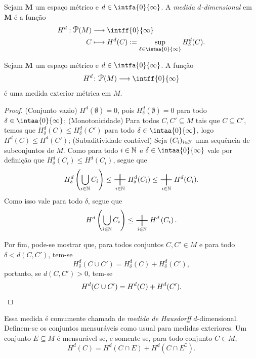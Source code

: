 \begin{defi}
Sejam $\bm M$ um espaço métrico e $d \in \intfa{0}{\infty}$. A \emph{medida $d$-dimensional} em $\bm M$ é a função
 	\begin{align*}
 	\func{H^d}{\p(M)}{\intff{0}{\infty}}{C}{H^d(C) := \sup_{\delta \in \intaa{0}{\infty}} H^d_\delta(C).}
 	\end{align*}
\end{defi}

\begin{prop}
Sejam $\bm M$ um espaço métrico e $d \in \intfa{0}{\infty}$. A função
	\begin{equation*}
	H^d\colon \p(M) \to \intff{0}{\infty}
	\end{equation*}
é uma medida exterior métrica em $M$.
\end{prop}
\begin{proof}
(Conjunto vazio) $H^d(\emptyset)=0$, pois $H^d_\delta(\emptyset)=0$ para todo $\delta \in \intaa{0}{\infty}$; (Monotonicidade) Para todos $C,C' \subseteq M$ tais que $C \subseteq C'$, temos que $H^d_\delta(C) \leq H^d_\delta(C')$ para todo $\delta \in \intaa{0}{\infty}$, logo $H^d(C) \leq H^d(C')$; (Subaditividade contável) Seja $(C_i)_{i \in \mathbb{N}}$ uma sequência de subconjuntos de $M$. Como para todo $i \in \mathbb{N}$ e $\delta \in \intaa{0}{\infty}$ vale por definição que $H^d_\delta(C_i) \leq H^d(C_i)$, segue que
	\begin{equation*}
	H^d_\delta\left( \bigcup_{i \in \N} C_i \right) \leq \sum_{i \in \N} H^d_\delta(C_i) \leq  \sum_{i \in \N} H^d(C_i).
	\end{equation*}
Como isso vale para todo $\delta$, segue que
	\begin{equation*}
	H^d\left( \bigcup_{i \in \N} C_i \right) \leq \sum_{i \in \N} H^d\left( C_i \right).
	\end{equation*}

Por fim, pode-se mostrar que, para todos conjuntos $C,C' \in M$ e para todo $\delta < d(C,C')$, tem-se
	\begin{equation*}
	H^d_\delta(C \cup C') = H^d_\delta(C) + H^d_\delta(C'),
	\end{equation*}
portanto, se $d(C,C') > 0$, tem-se
	\begin{equation*}
	H^d(C \cup C') = H^d(C) + H^d(C'). \qedhere
	\end{equation*}
\end{proof}

Essa medida é comumente chamada de \emph{medida de Hausdorff} $d$-dimensional. Definem-se os conjuntos mensuráveis como usual para medidas exteriores. Um conjunto $E \subseteq M$ é mensurável se, e somente se, para todo conjunto $C \in M$,
	\begin{equation*}
	H^d(C) = H^d(C \cap E) + H^d(C \cap E^\complement).
	\end{equation*}

